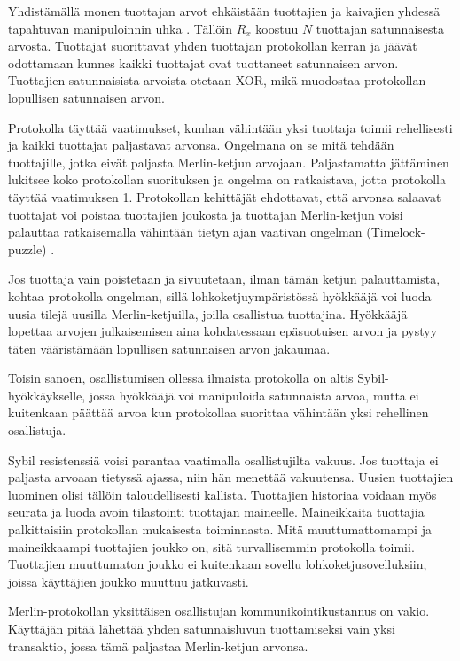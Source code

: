 Yhdistämällä monen tuottajan arvot ehkäistään tuottajien ja kaivajien yhdessä tapahtuvan manipuloinnin uhka \cite{MerlinChains}. Tällöin $R_x$ koostuu $N$ tuottajan satunnaisesta arvosta. Tuottajat suorittavat yhden tuottajan protokollan kerran ja jäävät odottamaan kunnes kaikki tuottajat ovat tuottaneet satunnaisen arvon. Tuottajien satunnaisista arvoista otetaan XOR, mikä muodostaa protokollan lopullisen satunnaisen arvon.

Protokolla täyttää vaatimukset, kunhan vähintään yksi tuottaja toimii rehellisesti ja kaikki tuottajat paljastavat arvonsa. Ongelmana on se mitä tehdään tuottajille, jotka eivät paljasta Merlin-ketjun arvojaan. Paljastamatta jättäminen lukitsee koko protokollan suorituksen ja ongelma on ratkaistava, jotta protokolla täyttää vaatimuksen 1. Protokollan kehittäjät ehdottavat, että arvonsa salaavat tuottajat voi poistaa tuottajien joukosta ja tuottajan Merlin-ketjun voisi palauttaa ratkaisemalla vähintään tietyn ajan vaativan ongelman (Timelock-puzzle) \cite{MerlinChains}.

Jos tuottaja vain poistetaan ja sivuutetaan, ilman tämän ketjun palauttamista, kohtaa protokolla ongelman, sillä lohkoketjuympäristössä hyökkääjä voi luoda uusia tilejä uusilla Merlin-ketjuilla, joilla osallistua tuottajina. Hyökkääjä lopettaa arvojen julkaisemisen aina kohdatessaan epäsuotuisen arvon ja pystyy täten vääristämään lopullisen satunnaisen arvon jakaumaa. 

Toisin sanoen, osallistumisen ollessa ilmaista protokolla on altis Sybil-hyökkäykselle, jossa hyökkääjä voi manipuloida satunnaista arvoa, mutta ei kuitenkaan päättää arvoa kun protokollaa suorittaa vähintään yksi rehellinen osallistuja.

Sybil resistenssiä voisi parantaa vaatimalla osallistujilta vakuus. Jos tuottaja ei paljasta arvoaan tietyssä ajassa, niin hän menettää vakuutensa. Uusien tuottajien luominen olisi tällöin taloudellisesti kallista. Tuottajien historiaa voidaan myös seurata ja luoda avoin tilastointi tuottajan maineelle. Maineikkaita tuottajia palkittaisiin protokollan mukaisesta toiminnasta. Mitä muuttumattomampi ja maineikkaampi tuottajien joukko on, sitä turvallisemmin protokolla toimii. Tuottajien muuttumaton joukko ei kuitenkaan sovellu lohkoketjusovelluksiin, joissa käyttäjien joukko muuttuu jatkuvasti. 

Merlin-protokollan yksittäisen osallistujan kommunikointikustannus on vakio. Käyttäjän pitää lähettää yhden satunnaisluvun tuottamiseksi vain yksi transaktio, jossa tämä paljastaa Merlin-ketjun arvonsa. 

